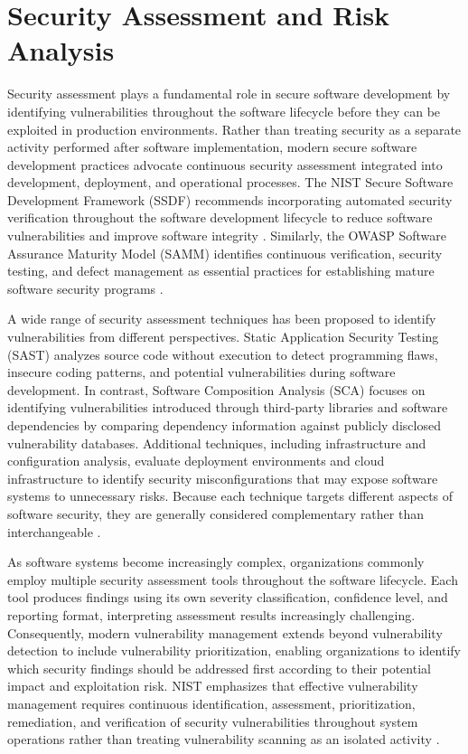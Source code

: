 \section{Security Assessment and Risk Analysis}
\label{sec:security_assessment_risk_analysis}

Security assessment plays a fundamental role in secure software development by identifying vulnerabilities throughout the software lifecycle before they can be exploited in production environments. Rather than treating security as a separate activity performed after software implementation, modern secure software development practices advocate continuous security assessment integrated into development, deployment, and operational processes. The NIST Secure Software Development Framework (SSDF) recommends incorporating automated security verification throughout the software development lifecycle to reduce software vulnerabilities and improve software integrity \cite{NISTSSDF2022}. Similarly, the OWASP Software Assurance Maturity Model (SAMM) identifies continuous verification, security testing, and defect management as essential practices for establishing mature software security programs \cite{OWASPSAMM2024}.

A wide range of security assessment techniques has been proposed to identify vulnerabilities from different perspectives. Static Application Security Testing (SAST) analyzes source code without execution to detect programming flaws, insecure coding patterns, and potential vulnerabilities during software development. In contrast, Software Composition Analysis (SCA) focuses on identifying vulnerabilities introduced through third-party libraries and software dependencies by comparing dependency information against publicly disclosed vulnerability databases. Additional techniques, including infrastructure and configuration analysis, evaluate deployment environments and cloud infrastructure to identify security misconfigurations that may expose software systems to unnecessary risks. Because each technique targets different aspects of software security, they are generally considered complementary rather than interchangeable \cite{NISTSSDF2022, OWASPSAMM2024}.

As software systems become increasingly complex, organizations commonly employ multiple security assessment tools throughout the software lifecycle. Each tool produces findings using its own severity classification, confidence level, and reporting format, interpreting assessment results increasingly challenging. Consequently, modern vulnerability management extends beyond vulnerability detection to include vulnerability prioritization, enabling organizations to identify which security findings should be addressed first according to their potential impact and exploitation risk. NIST emphasizes that effective vulnerability management requires continuous identification, assessment, prioritization, remediation, and verification of security vulnerabilities throughout system operations rather than treating vulnerability scanning as an isolated activity \cite{NIST80040r4}.


